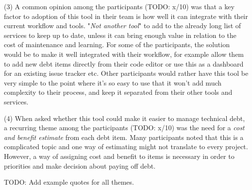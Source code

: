 (3) A common opinion among the participants (TODO: x/10) was that a key factor to adoption of this tool in their team is how well it can integrate with their current workflow and tools.
"\textit{Not another tool}" to add to the already long list of services to keep up to date, unless it can bring enough value in relation to the cost of maintenance and learning.
For some of the participants, the solution would be to make it well integrated with their workflow, for example allow them to add new debt items directly from their code editor or use this as a dashboard for an existing issue tracker etc.
Other participants would rather have this tool be very simple to the point where it's so easy to use that it won't add much complexity to their process, and keep it separated from their other tools and services.

(4) When asked whether this tool could make it easier to manage technical debt, a recurring theme among the participants (TODO: x/10) was the need for a \textit{cost and benefit estimate} from each debt item.
Many participants noted that this is a complicated topic and one way of estimating might not translate to every project.
However, a way of assigning cost and benefit to items is necessary in order to priorities and make decision about paying off debt.

TODO: Add example quotes for all themes.